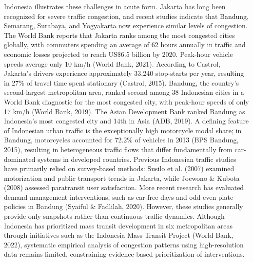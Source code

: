 \documentclass[12pt,a4paper]{article}
\begin{document}
Indonesia illustrates these challenges in acute form. Jakarta has long been recognized for severe traffic congestion, and recent studies indicate that Bandung, Semarang, Surabaya, and Yogyakarta now experience similar levels of congestion. The World Bank reports that Jakarta ranks among the most congested cities globally, with commuters spending an average of 62 hours annually in traffic and economic losses projected to reach US\$6.5 billion by 2020. Peak-hour vehicle speeds average only 10 km/h (World Bank, 2021). According to Castrol, Jakarta's drivers experience approximately 33,240 stop-starts per year, resulting in 27\% of travel time spent stationary (Castrol, 2015). Bandung, the country's second-largest metropolitan area, ranked second among 38 Indonesian cities in a World Bank diagnostic for the most congested city, with peak-hour speeds of only 17 km/h (World Bank, 2019). The Asian Development Bank ranked Bandung as Indonesia's most congested city and 14th in Asia (ADB, 2019). A defining feature of Indonesian urban traffic is the exceptionally high motorcycle modal share; in Bandung, motorcycles accounted for 72.2\% of vehicles in 2013 (BPS Bandung, 2015), resulting in heterogeneous traffic flows that differ fundamentally from car-dominated systems in developed countries. Previous Indonesian traffic studies have primarily relied on survey-based methods: Susilo et al. (2007) examined motorization and public transport trends in Jakarta, while Joewono \& Kubota (2008) assessed paratransit user satisfaction. More recent research has evaluated demand management interventions, such as car-free days and odd-even plate policies in Bandung (Syaiful \& Fadlilah, 2020). However, these studies generally provide only snapshots rather than continuous traffic dynamics. Although Indonesia has prioritized mass transit development in six metropolitan areas through initiatives such as the Indonesia Mass Transit Project (World Bank, 2022), systematic empirical analysis of congestion patterns using high-resolution data remains limited, constraining evidence-based prioritization of interventions.
\end{document}
